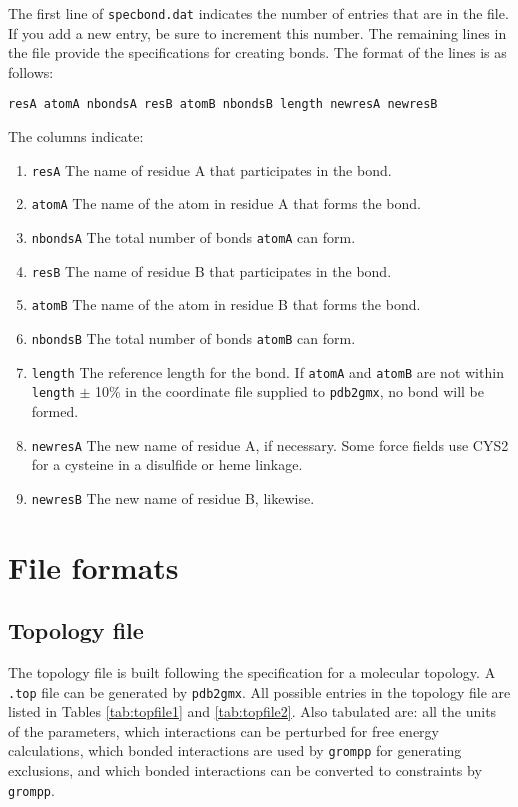 The first line of {\tt specbond.dat} indicates the number of entries that are in the file. If you
add a new entry, be sure to increment this number. The remaining lines in the file provide the
specifications for creating bonds. The format of the lines is as follows:

{\tt resA  atomA  nbondsA  resB  atomB  nbondsB  length  newresA  newresB }

The columns indicate:
\begin{enumerate}
\item {\tt resA} The name of residue A that participates in the bond.
\item {\tt atomA} The name of the atom in residue A that forms the bond.
\item {\tt nbondsA} The total number of bonds {\tt atomA} can form.
\item {\tt resB} The name of residue B that participates in the bond.
\item {\tt atomB} The name of the atom in residue B that forms the bond.
\item {\tt nbondsB} The total number of bonds {\tt atomB} can form.
\item {\tt length} The reference length for the bond. If {\tt atomA} and {\tt atomB} are not within
{\tt length} $\pm$ 10\% in the coordinate file supplied to {\tt pdb2gmx}, no bond will be formed.
\item {\tt newresA} The new name of residue A, if necessary. Some force fields use {\eg} CYS2 for 
a cysteine in a disulfide or heme linkage.
\item {\tt newresB} The new name of residue B, likewise.
\end{enumerate}


\section{File formats}
\subsection{Topology file}
\label{subsec:topfile}
The topology file is built following the {\gromacs} specification for a
molecular topology.  A {\tt *.top} file can be generated by
{\tt pdb2gmx}.
All possible entries in the topology file are listed in
Tables \ref{tab:topfile1} and \ref{tab:topfile2}.
Also tabulated are: all the units
of the parameters, which interactions can be perturbed for free energy
calculations, which bonded interactions are used by {\tt grompp}
for generating exclusions, and which bonded interactions can be converted
to constraints by {\tt grompp}.

